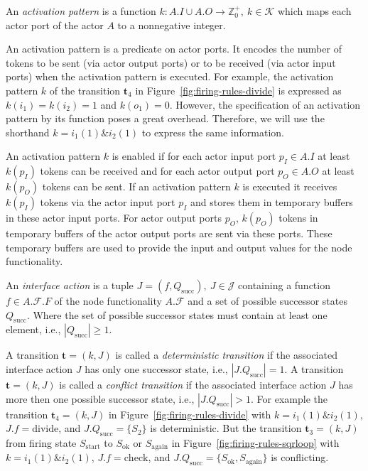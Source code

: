 \begin{sdefinition}\label{activation-pattern}
  An \emph{activation pattern} is a function
  $k: A.I \cup A.O \to \mathbb{Z}^+_0,\ k \in \mathcal{K}$
  which maps each actor port of the actor $A$ to a nonnegative integer.
\end{sdefinition}

An activation pattern is a predicate on actor ports. It encodes the number of
tokens to be sent (via actor output ports) or to be received (via actor input ports)
when the activation pattern is executed.
For example, the activation pattern $k$ of the transition $\mathbf{t}_4$
in Figure~\ref{fig:firing-rules-divide} is
expressed as $k(i_1) = k(i_2) = 1$ and $k(o_1) = 0$.
However, the specification of an activation pattern by its function
poses a great overhead. Therefore, we will use the shorthand
$k = i_1(1) \& i_2(1)$ to express the same information.

An activation pattern $k$ is enabled if for each actor input port
$p_I \in A.I$ at least $k(p_I)$ tokens can be received and for each
actor output port $p_O \in A.O$ at least $k(p_O)$ tokens can be sent.
If an activation pattern $k$ is executed it receives $k(p_I)$ tokens
via the actor input port $p_I$ and stores them in
temporary buffers in these actor input ports. For actor output ports
$p_O$, $k(p_O)$ tokens in temporary buffers of the actor
output ports are sent via these ports. These temporary buffers are
used to provide the input and output values for the node functionality.

\begin{sdefinition}\label{interface-action}
  An \emph{interface action} is a tuple $J = (f,Q_\mathrm{succ}),\ J \in \mathcal{J}$ containing
  a function $f \in A.\mathcal{F}.F$ of the node functionality $A.\mathcal{F}$
  and a set of possible successor states $Q_\mathrm{succ}$. Where the set of
  possible successor states must contain at least one element, i.e.,
  $|Q_\mathrm{succ}| \ge 1$.
\end{sdefinition}

A transition $\mathbf{t} = (k,J)$ is called a \emph{deterministic transition}
if the associated interface action $J$ has only one successor state, i.e.,
$|J.Q_\mathrm{succ}| = 1$. A transition $\mathbf{t} = (k,J)$ is called a
\emph{conflict transition} if the associated interface action $J$ has more
then one possible successor state, i.e., $|J.Q_\mathrm{succ}| > 1$.
For example the transition $\mathbf{t}_4 = (k,J)$
in Figure~\ref{fig:firing-rules-divide} with $k = i_1(1) \& i_2(1)$,
$J.f = \mathrm{divide}$, and $J.Q_\mathrm{succ} = \{S_2\}$ is deterministic.
But the transition $\mathbf{t}_3 = (k,J)$ from firing state $S_{\mathrm{start}}$
to $S_\mathrm{ok}$ or $S_\mathrm{again}$
in Figure~\ref{fig:firing-rules-sqrloop} with $k = i_1(1) \& i_2(1)$,
$J.f = \mathrm{check}$, and $J.Q_\mathrm{succ} = \{S_\mathrm{ok}, S_\mathrm{again}\}$
is conflicting.

